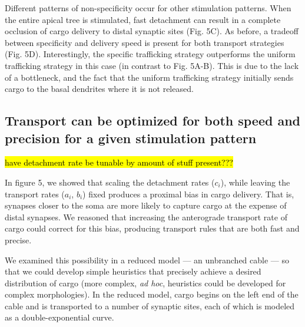 \documentclass[10pt]{wlpeerj}
\begin{document}
Different patterns of non-specificity occur for other stimulation patterns.
When the entire apical tree is stimulated, fast detachment can result in a complete occlusion of cargo delivery to distal synaptic sites (Fig. 5C).
As before, a tradeoff between specificity and delivery speed is present for both transport strategies (Fig. 5D).
Interestingly, the specific trafficking strategy outperforms the uniform trafficking strategy in this case (in contrast to Fig. 5A-B).
This is due to the lack of a bottleneck, and the fact that the uniform trafficking strategy initially sends cargo to the basal dendrites where it is not released.

\subsection*{Transport can be optimized for both speed and precision for a given stimulation pattern}

\hl{have detachment rate be tunable by amount of stuff present???}

In figure 5, we showed that scaling the detachment rates ($c_i$), while leaving the transport rates ($a_i$, $b_i$) fixed produces a proximal bias in cargo delivery.
That is, synapses closer to the soma are more likely to capture cargo at the expense of distal synapses.
We reasoned that increasing the anterograde transport rate of cargo could correct for this bias, producing transport rules that are both fast and precise.

We examined this possibility in a reduced model --- an unbranched cable --- so that we could develop simple heuristics that precisely achieve a desired distribution of cargo (more complex, \textit{ad hoc}, heuristics could be developed for complex morphologies).
In the reduced model, cargo begins on the left end of the cable and is transported to a number of synaptic sites, each of which is modeled as a double-exponential curve.
\end{document}
